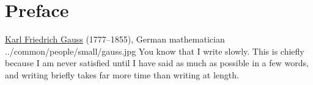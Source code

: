 ﻿%

\section*{Preface}
\qboxnps
  {
    \href{http://en.wikipedia.org/wiki/Carl_Friedrich_Gauss}{Karl Friedrich Gauss}
    (1777--1855), German mathematician
    \footnotemark
  }
  {../common/people/small/gauss.jpg}
  {You know that I write slowly.
    This is chiefly because I am never satisfied until I have said as much as
    possible in a few words,
    and writing briefly takes far more time than writing at length.}




%


